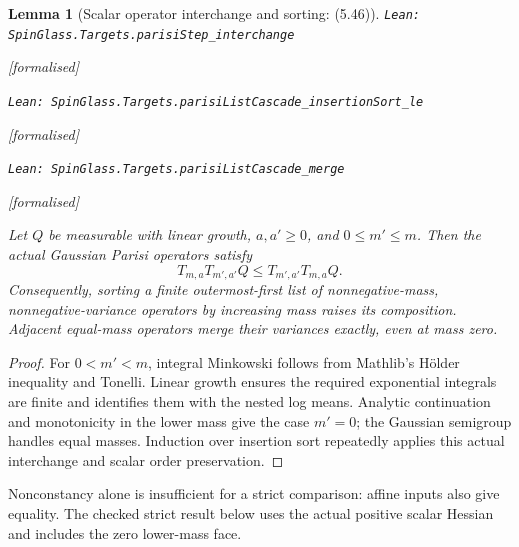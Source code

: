 \documentclass[11pt]{article}
\providecommand{\lean}[1]{\leavevmode\par\nopagebreak
  {\noindent\normalfont\footnotesize\raggedright\texttt{Lean: #1}\par}\nopagebreak}
\providecommand{\leanok}{\par\nopagebreak
  {\noindent\normalfont\footnotesize\textcolor{green!50!black}{[formalised]}\par}\nopagebreak}
\newtheorem{lemma}[theorem]{Lemma}
\begin{document}
\begin{lemma}[Scalar operator interchange and sorting: (5.46)]
\lean{SpinGlass.Targets.parisiStep\_interchange}\leanok
\lean{SpinGlass.Targets.parisiListCascade\_insertionSort\_le}\leanok
\lean{SpinGlass.Targets.parisiListCascade\_merge}\leanok
Let $Q$ be measurable with linear growth, $a,a'\ge0$, and $0\le m'\le m$.
Then the actual Gaussian Parisi operators satisfy
\[
 T_{m,a}T_{m',a'}Q\le T_{m',a'}T_{m,a}Q.
\]
Consequently, sorting a finite outermost-first list of nonnegative-mass,
nonnegative-variance operators by increasing mass raises its composition.
Adjacent equal-mass operators merge their variances exactly, even at mass zero.
\end{lemma}
\begin{proof}
For $0<m'<m$, integral Minkowski follows from Mathlib's H\"older inequality
and Tonelli. Linear growth ensures the required exponential integrals are
finite and identifies them with the nested log means. Analytic continuation
and monotonicity in the lower mass give the case $m'=0$; the Gaussian
semigroup handles equal masses. Induction over insertion sort repeatedly
applies this actual interchange and scalar order preservation.
\end{proof}
Nonconstancy alone is insufficient for a strict comparison: affine inputs
also give equality. The checked strict result below uses the actual positive
scalar Hessian and includes the zero lower-mass face.
\end{document}
